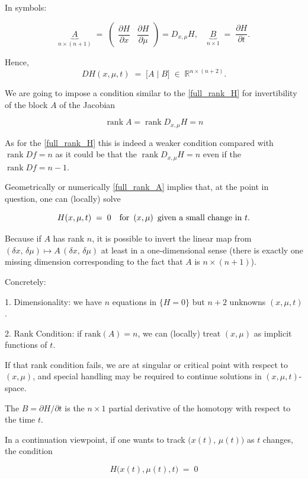 \documentclass[11pt,american]{article}
\DeclareMathOperator{\rank}{\operatorname{rank}}
\begin{document}
In symbols:

\[
\underbrace{A}_{n\times(n+1)}
\;=\;
\begin{pmatrix}
\dfrac{\partial H}{\partial x} & \dfrac{\partial H}{\partial \mu}
\end{pmatrix} = D_{x,\mu} H,
\quad
\underbrace{B}_{n\times1}
\;=\;
\dfrac{\partial H}{\partial t}.
\]

Hence,
\[
DH(x,\mu,t) 
\;=\;
\bigl[A \;\big|\; B\bigr]
\;\in\;\mathbb{R}^{n\times(n+2)}.
\]

We are going to impose a condition similar to the \eqref{full_rank_H} for invertibility of the block $A$ of the Jacobian

\begin{equation}\label{full_rank_A}
\rank A = \rank D_{x,\mu} H = n
\end{equation}

As for the \eqref{full_rank_H} this is indeed a weaker condition compared with $\rank D f = n$ as it could be that the $\rank D_{x,\mu} H = n$ even if the $\rank D f = n - 1$.

Geometrically or numerically \eqref{full_rank_A} implies that, at the point in question, one can (locally) solve

\[
H(x,\mu,t)\;=\;0
\quad\text{for $\,(x,\mu)$\, given a small change in $t$.}
\]

Because if $A$ has rank $n$, it is possible to invert the linear map from $(\delta x,\,\delta\mu)\mapsto A\,(\delta x,\,\delta\mu)$ at least in a one-dimensional sense (there is exactly one missing dimension corresponding to the fact that $A$ is $n\times(n+1)$). 

Concretely:

1. Dimensionality: we have $n$ equations in $\{H=0\}$ but $n+2$ unknowns $(x,\mu,t)$.
  
2. Rank Condition: if $\mathrm{rank}(A)=n$, we can (locally) treat $(x,\mu)$ as implicit functions of $t$.  

If that rank condition fails, we are at singular or critical point with respect to $(x,\mu)$, and special handling may be required to continue solutions in $(x,\mu,t)$-space.

The $B = \partial H/\partial t$ is the $n\times1$ partial derivative of the homotopy with respect to the time $t$.

In a continuation viewpoint, if one wants to track $\bigl(x(t),\,\mu(t)\bigr)$ as $t$ changes, the condition

\[
H\bigl(x(t),\mu(t),t\bigr)\;=\;0
\]
\end{document}
